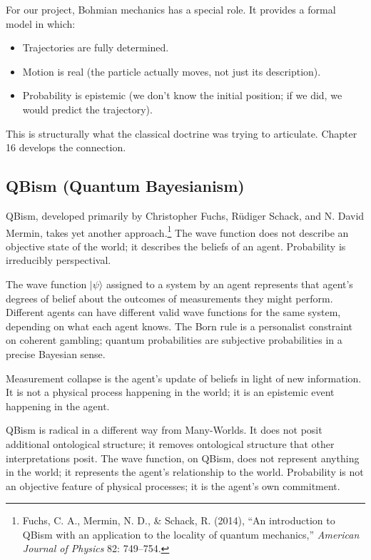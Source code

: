 For our project, Bohmian mechanics has a special role. It provides a
formal model in which:
\begin{itemize}[leftmargin=2em]
    \item Trajectories are fully determined.
    \item Motion is real (the particle actually moves, not just its
    description).
    \item Probability is epistemic (we don't know the initial
    position; if we did, we would predict the trajectory).
\end{itemize}
This is structurally what the classical  doctrine was
trying to articulate. Chapter 16 develops the connection.

\subsection{QBism (Quantum Bayesianism)}

QBism, developed primarily by Christopher Fuchs, R\"udiger Schack,
and N. David Mermin, takes yet another approach.\footnote{Fuchs, C.
A., Mermin, N. D., \& Schack, R. (2014), ``An introduction to QBism
with an application to the locality of quantum mechanics,''
\emph{American Journal of Physics} 82: 749--754.} The wave function
does not describe an objective state of the world; it describes the
beliefs of an agent. Probability is irreducibly perspectival.

\begin{principlebox}[QBism]
\label{prin:qbism}
The wave function $|\psi\rangle$ assigned to a system by an agent
represents that agent's degrees of belief about the outcomes of
measurements they might perform. Different agents can have
different valid wave functions for the same system, depending on
what each agent knows. The Born rule is a personalist constraint
on coherent gambling; quantum probabilities are subjective
probabilities in a precise Bayesian sense.

Measurement collapse is the agent's update of beliefs in light of
new information. It is not a physical process happening in the
world; it is an epistemic event happening in the agent.
\end{principlebox}

QBism is radical in a different way from Many-Worlds. It does not
posit additional ontological structure; it removes ontological
structure that other interpretations posit. The wave function, on
QBism, does not represent anything in the world; it represents the
agent's relationship to the world. Probability is not an objective
feature of physical processes; it is the agent's own commitment.

